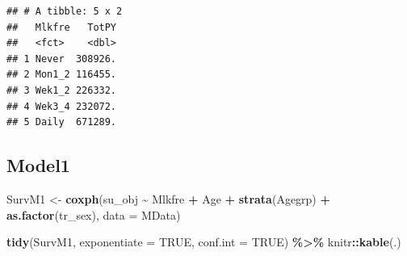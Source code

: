 \documentclass[
]{article}
\newenvironment{Shaded}{\begin{snugshade}}{\end{snugshade}}
\newcommand{\DataTypeTok}[1]{\textcolor[rgb]{0.13,0.29,0.53}{#1}}
\newcommand{\KeywordTok}[1]{\textcolor[rgb]{0.13,0.29,0.53}{\textbf{#1}}}
\newcommand{\NormalTok}[1]{#1}
\newcommand{\OperatorTok}[1]{\textcolor[rgb]{0.81,0.36,0.00}{\textbf{#1}}}
\newcommand{\OtherTok}[1]{\textcolor[rgb]{0.56,0.35,0.01}{#1}}
\newcommand{\StringTok}[1]{\textcolor[rgb]{0.31,0.60,0.02}{#1}}
\begin{document}
\begin{verbatim}
## # A tibble: 5 x 2
##   Mlkfre   TotPY
##   <fct>    <dbl>
## 1 Never  308926.
## 2 Mon1_2 116455.
## 3 Wek1_2 226332.
## 4 Wek3_4 232072.
## 5 Daily  671289.
\end{verbatim}

\hypertarget{model1}{%
\subsection{Model1}\label{model1}}

\begin{Shaded}
\begin{Highlighting}[]
\NormalTok{SurvM1 \textless{}{-}}\StringTok{  }\KeywordTok{coxph}\NormalTok{(su\_obj }\OperatorTok{\textasciitilde{}}\StringTok{ }\NormalTok{Mlkfre }\OperatorTok{+}\StringTok{ }\NormalTok{Age }\OperatorTok{+}\StringTok{ }\KeywordTok{strata}\NormalTok{(Agegrp) }\OperatorTok{+}\StringTok{ }\KeywordTok{as.factor}\NormalTok{(tr\_sex), }
                 \DataTypeTok{data =}\NormalTok{ MData)}

\KeywordTok{tidy}\NormalTok{(SurvM1, }\DataTypeTok{exponentiate =} \OtherTok{TRUE}\NormalTok{, }\DataTypeTok{conf.int =} \OtherTok{TRUE}\NormalTok{) }\OperatorTok{\%\textgreater{}\%}\StringTok{ }
\StringTok{  }\NormalTok{knitr}\OperatorTok{::}\KeywordTok{kable}\NormalTok{(.)}
\end{Highlighting}
\end{Shaded}
\end{document}
